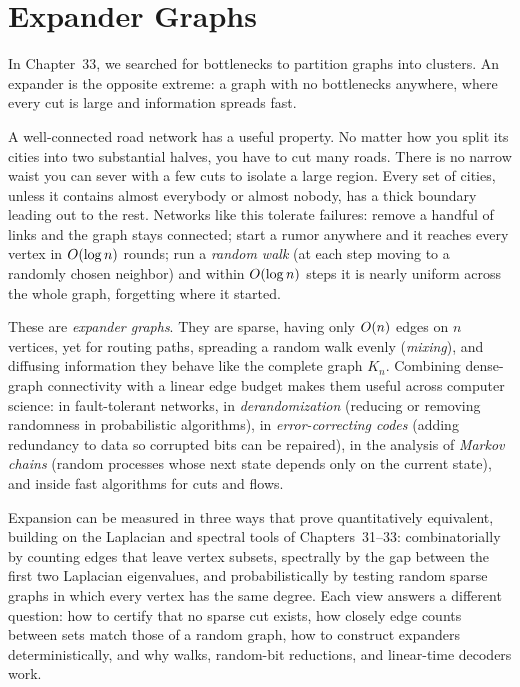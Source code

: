 \chapter{Expander Graphs}

In Chapter~33, we searched for bottlenecks to partition graphs into clusters. An expander is the opposite extreme: a graph with no bottlenecks anywhere, where every cut is large and information spreads fast.

A well-connected road network has a useful property. No matter how you split its cities into two substantial halves, you have to cut many roads. There is no narrow waist you can sever with a few cuts to isolate a large region. Every set of cities, unless it contains almost everybody or almost nobody, has a thick boundary leading out to the rest. Networks like this tolerate failures: remove a handful of links and the graph stays connected; start a rumor anywhere and it reaches every vertex in $O(\log n)$ rounds; run a \emph{random walk} (at each step moving to a randomly chosen neighbor) and within $O(\log n)$ steps it is nearly uniform across the whole graph, forgetting where it started.

These are \emph{expander graphs}. They are sparse, having only $O(n)$ edges on $n$ vertices, yet for routing paths, spreading a random walk evenly (\emph{mixing}), and diffusing information they behave like the complete graph $K_n$. Combining dense-graph connectivity with a linear edge budget makes them useful across computer science: in fault-tolerant networks, in \emph{derandomization} (reducing or removing randomness in probabilistic algorithms), in \emph{error-correcting codes} (adding redundancy to data so corrupted bits can be repaired), in the analysis of \emph{Markov chains} (random processes whose next state depends only on the current state), and inside fast algorithms for cuts and flows.

Expansion can be measured in three ways that prove quantitatively equivalent, building on the Laplacian and spectral tools of Chapters~31--33: combinatorially by counting edges that leave vertex subsets, spectrally by the gap between the first two Laplacian eigenvalues, and probabilistically by testing random sparse graphs in which every vertex has the same degree. Each view answers a different question: how to certify that no sparse cut exists, how closely edge counts between sets match those of a random graph, how to construct expanders deterministically, and why walks, random-bit reductions, and linear-time decoders work.

